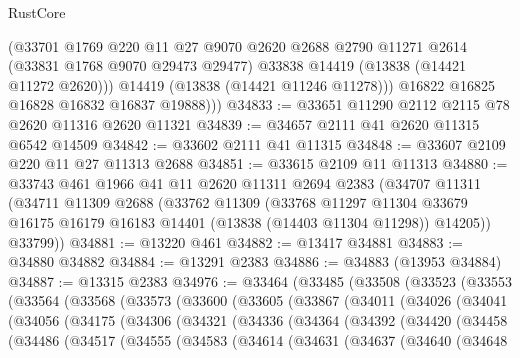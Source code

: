 \begin{lexlean}{RustCore}
\begin{coremodule}
            (@33701
              @1769
              @220
              @11
              @27
              @9070
              @2620
              @2688
              @2790
              @11271
              @2614
              (@33831 @1768 @9070 @29473 @29477)
              @33838
              @14419
              (@13838 (@14421 @11272 @2620)))
            @14419
            (@13838 (@14421 @11246 @11278)))
          @16822
          @16825
          @16828
          @16832
          @16837
          @19888)))
@34833 := @33651 @11290 @2112 @2115 @78 @2620 @11316 @2620 @11321
@34839 := @34657 @2111 @41 @2620 @11315 @6542 @14509
@34842 := @33602 @2111 @41 @11315
@34848 := @33607 @2109 @220 @11 @27 @11313 @2688
@34851 := @33615 @2109 @11 @11313
@34880 := @33743
    @461
    @1966
    @41
    @11
    @2620
    @11311
    @2694
    @2383
    (@34707
      @11311
      (@34711
        @11309
        @2688
        (@33762
          @11309
          (@33768
            @11297
            @11304
            @33679
            @16175
            @16179
            @16183
            @14401
            (@13838 (@14403 @11304 @11298))
            @14205))
        @33799))
@34881 := @13220 @461
@34882 := @13417 @34881
@34883 := @34880 @34882
@34884 := @13291 @2383
@34886 := @34883 (@13953 @34884)
@34887 := @13315 @2383
@34976 := @33464
    (@33485
      (@33508
        (@33523
          (@33553
            (@33564
              (@33568
                (@33573
                  (@33600
                    (@33605
                      (@33867
                        (@34011
                          (@34026
                            (@34041
                              (@34056
                                (@34175
                                  (@34306
                                    (@34321
                                      (@34336
                                        (@34364
                                          (@34392
                                            (@34420
                                              (@34458
                                                (@34486
                                                  (@34517
                                                    (@34555
                                                      (@34583
                                                        (@34614
                                                          (@34631
                                                            (@34637
                                                              (@34640
                                                                (@34648

\end{coremodule}
\end{lexlean}
